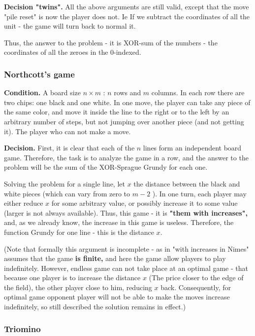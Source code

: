\textbf{Decision "twins".} All the above arguments are still valid, except that the move "pile reset" is now the player does not. Ie If we subtract the coordinates of all the unit - the game will turn back to normal it.

Thus, the answer to the problem - it is XOR-sum of the numbers - the coordinates of all the zeroes in the 0-indexed.

\subsubsection{ Northcott's game }

\textbf{Condition.} A board size $n \times m$ : $n$ rows and $m$ columns. In each row there are two chips: one black and one white. In one move, the player can take any piece of the same color, and move it inside the line to the right or to the left by an arbitrary number of steps, but not jumping over another piece (and not getting it). The player who can not make a move.

\textbf{Decision.} First, it is clear that each of the $n$ lines form an independent board game. Therefore, the task is to analyze the game in a row, and the answer to the problem will be the sum of the XOR-Sprague Grundy for each one.

Solving the problem for a single line, let $x$ the distance between the black and white pieces (which can vary from zero to $m-2$ ). In one turn, each player may either reduce $x$ for some arbitrary value, or possibly increase it to some value (larger is not always available). Thus, this game - it is \textbf{"them with increases",} and, as we already know, the increase in this game is useless. Therefore, the function Grundy for one line - this is the distance $x$.

(Note that formally this argument is incomplete - as in "with increases in Nimes" assumes that the game \textbf{is finite,} and here the game allow players to play indefinitely. However, endless game can not take place at an optimal game - that because one player is to increase the distance $x$ (The price closer to the edge of the field), the other player close to him, reducing $x$ back. Consequently, for optimal game opponent player will not be able to make the moves increase indefinitely, so still described the solution remains in effect.)

\subsubsection{ Triomino }

